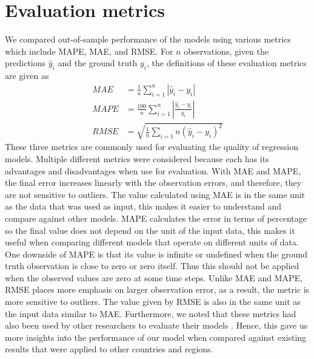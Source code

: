 \section{Evaluation metrics}
\label{sec:methodologies-evaluation-metrics}

We compared out-of-sample performance of the models using various metrics which include \gls{MAPE}, \gls{MAE}, and \gls{RMSE}. For $n$ observations, given the predictions $\hat{y}_i$ and the ground truth $y_i$, the definitions of these evaluation metrics are given as
\begin{align*}
    MAE &= \frac{1}{n} \sum_{i=1}^n \left| \hat{y}_i - y_i \right| \\
    MAPE &= \frac{100}{n} \sum_{i=1}^n \left| \frac{\hat{y}_i - y_i}{y_i} \right| \\
    RMSE &= \sqrt{\frac{1}{n} \sum_{i=1}{n} (\hat{y}_i - y_i)^2}
\end{align*}
These three metrics are commonly used for evaluating the quality of regression models.
Multiple different metrics were considered because each has its advantages and disadvantages when use for evaluation.
With \gls{MAE} and \gls{MAPE}, the final error increases linearly with the observation errors, and therefore, they are not sensitive to outliers.
The value calculated using \gls{MAE} is in the same unit as the data that was used as input, this makes it easier to understand and compare against other models.
\gls{MAPE} calculates the error in terms of percentage so the final value does not depend on the unit of the input data, this makes it useful when comparing different models that operate on different units of data.
One downside of \gls{MAPE} is that its value is infinite or undefined when the ground truth observation is close to zero or zero itself.
Thus this should not be applied when the observed values are zero at some time steps.
Unlike \gls{MAE} and \gls{MAPE}, \gls{RMSE} places more emphasis on larger observation error, as a result, the metric is more sensitive to outliers.
The value given by \gls{RMSE} is also in the same unit as the input data similar to \gls{MAE}.
Furthermore, we noted that these metrics had also been used by other researchers to evaluate their models \cite{rayEnsembleForecastsCoronavirus2020, ihmecovid-19forecastingteamModelingCOVID19Scenarios2021,arikInterpretableSequenceLearning}.
Hence, this gave us more insights into the performance of our model when compared against existing results that were applied to other countries and regions.
